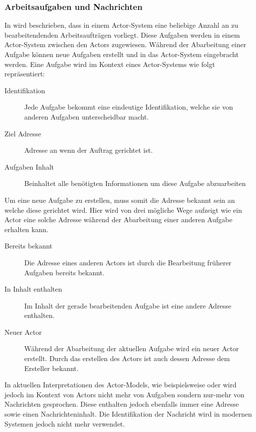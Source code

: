 \subsubsection{Arbeitsaufgaben und Nachrichten}\label{actors:messages}
In \cite{Agha1985ActorsSystems} wird beschrieben, dass in einem Actor-System eine beliebige Anzahl an zu bearbeitendenden Arbeitsaufträgen vorliegt. Diese Aufgaben werden in einem Actor-System zwischen den Actors zugewiesen. Während der Abarbeitung einer Aufgabe können neue Aufgaben erstellt und in das Actor-System eingebracht werden. Eine Aufgabe wird im Kontext eines Actor-Systems wie folgt repräsentiert:
\begin{description}
    \item[Identifikation] Jede Aufgabe bekommt eine eindeutige Identifikation, welche sie von anderen Aufgaben unterscheidbar macht.
    \item[Ziel Adresse] Adresse an wenn der Auftrag gerichtet ist.
    \item[Aufgaben Inhalt] Beinhaltet alle benötigten Informationen um diese Aufgabe abzuarbeiten
\end{description} 
Um eine neue Aufgabe zu erstellen, muss somit die Adresse bekannt sein an welche diese gerichtet wird. Hier wird von \cite{Agha1985ActorsSystems} drei mögliche Wege aufzeigt wie ein Actor eine solche Adresse während der Abarbeitung einer anderen Aufgabe erhalten kann.
\begin{description}
    \item[Bereits bekannt] Die Adresse eines anderen Actors ist durch die Bearbeitung früherer Aufgaben bereits bekannt.
    \item[In Inhalt enthalten] Im Inhalt der gerade bearbeitenden Aufgabe ist eine andere Adresse enthalten.
    \item[Neuer Actor] Während der Abarbeitung der aktuellen Aufgabe wird ein neuer Actor erstellt. Durch das erstellen des Actors ist auch dessen Adresse dem Ersteller bekannt.
\end{description}
In aktuellen Interpretationen des Actor-Models, wie beispielsweise \cite{Vernon2015ReactiveAkka} oder \cite{Brown2016ReactiveAkka.net.} wird jedoch im Kontext von Actors nicht mehr von Aufgaben sondern nur-mehr von Nachrichten gesprochen. Diese enthalten jedoch ebenfalls immer eine Adresse sowie einen Nachrichteninhalt. Die Identifikation der Nachricht wird in modernen Systemen jedoch nicht mehr verwendet. \\
